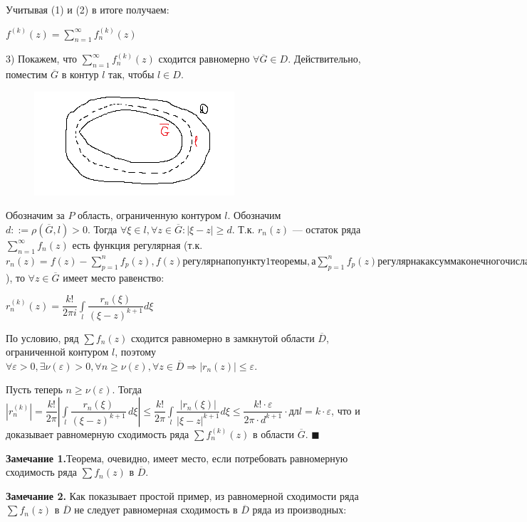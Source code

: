 \documentclass[a4paper, 12pt]{report}
\begin{document}
Учитывая (1) и (2) в итоге получаем:

\begin{center}
    $f^{(k)}(z) = \sum\limits_{n=1}^{\infty}f_n^{(k)}(z)$
\end{center}

3) Покажем, что $\sum\limits_{n=1}^{\infty}f_n^{(k)}(z)$ сходится равномерно $\forall \overline{G} \in D$. Действительно, поместим $\overline{G}$ в контур $l$ так, чтобы $l \in D$. 
\par\bigskip\par\bigskip
\begin{figure} 
    \vspace{-5ex}
    \includegraphics{GinDVeyerhtrass.png}
\end{figure}

Обозначим за $P$ область, ограниченную контуром $l$. Обозначим $d ::= \rho(\overline{G}, l) > 0$. Тогда $\forall \xi \in l, \forall z \in \overline{G}: |\xi - z| \geq d$. Т.к. $r_n(z)$ --- остаток ряда $\sum\limits_{n=1}^{\infty}f_n(z)$ есть функция регулярная (т.к. $r_n(z) = f(z) - \sum\limits_{p=1}^n f_p(z), f(z) регулярна по пункту 1 теоремы, а \sum\limits_{p=1}^n f_p(z) регулярна как сумма конечного числа регулярных функций$), то $\forall z \in \overline{G}$ имеет место равенство:

\begin{center}
    $r_n^{(k)}(z) = \dfrac{k!}{2\pi i}\int\limits_{l}\dfrac{r_n(\xi)}{(\xi - z)^{k+1}}d\xi$
\end{center}

По условию, ряд $\sum f_n(z)$ сходится равномерно в замкнутой области $\overline{D}$, ограниченной контуром $l$, поэтому $\forall \varepsilon > 0, \exists \nu(\varepsilon) > 0, \forall n \geq \nu(\varepsilon), \forall z \in \overline{D} \Rightarrow |r_n(z)| \leq \varepsilon$.

Пусть теперь $n \geq \nu(\varepsilon)$. Тогда $|r_n^{(k)}| = \dfrac{k!}{2\pi}|\int\limits_l \dfrac{r_n(\xi)}{(\xi - z)^{k+1}}\,d\xi| \leq \dfrac{k!}{2\pi}\int\limits_l\dfrac{|r_n(\xi)|}{|\xi - z|^{k+1}}d\xi \leq \dfrac{k! \cdot \varepsilon}{2\pi \cdot d^{k+1}} \cdot$дл$l = k\cdot \varepsilon$, что и доказывает равномерную сходимость ряда $\sum f_n^{(k)}(z)$ в области $\overline{G}$. $\blacksquare$
\par\bigskip
\textbf{Замечание 1.}\quad Теорема, очевидно, имеет место, если потребовать равномерную сходимость ряда $\sum f_n(z)$ в $\overline{D}$.
\par\bigskip
\textbf{Замечание 2.} \quad Как показывает простой пример, из равномерной сходимости ряда $\sum f_n(z)$ в $\overline{D}$ не следует равномерная сходимость в $\overline{D}$ ряда из производных:
\end{document}
